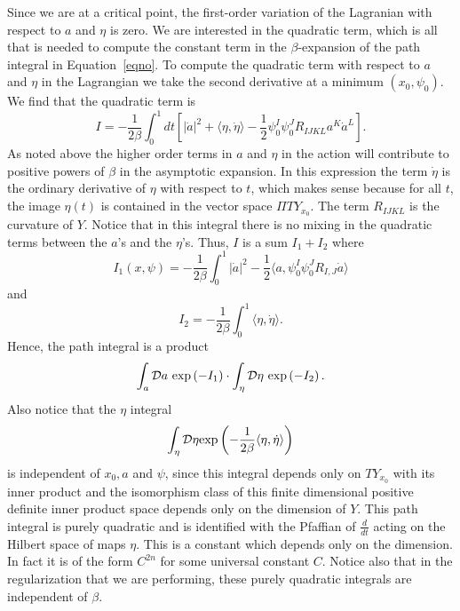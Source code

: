 Since we are at a critical point, the first-order variation of the
Lagranian with respect to $a$ and $\eta$ is zero.
We are interested in the quadratic term, which is all that is needed
to compute the constant term in the $\beta$-expansion of
the path integral in Equation~\ref{eqno}.
To compute the quadratic term with respect to $a$ and $\eta$ 
in the Lagrangian we take the second 
derivative at a minimum $(x_0,\psi_0)$.
We find that the quadratic term
is
$$I=-\frac{1}{2\beta}\int_0^1dt\left[|\dot a|^2+\langle
\eta,\dot\eta\rangle-\frac{1}{2}\psi_0^I\psi_0^JR_{IJKL}a^K\dot
a^L\right].$$
As noted above the higher order terms in $a$ and $\eta$ in the action
will contribute to positive powers of 
$\beta$ in the asymptotic expansion.
In this expression the term $\dot \eta$ is the ordinary derivative of
$\eta$ with respect to $t$, which makes sense because for all $t$, the
image $\eta(t)$ is
contained in the vector space $\Pi TY_{x_0}$.
The term $R_{IJKL}$ is the curvature of $Y$.
Notice that in this integral there is no mixing in the quadratic terms
between the $a$'s and the $\eta$'s. 
Thus, $I$ is a sum  $I_1+I_2$
where
$$I_1(x,\psi)=-\frac{1}{2\beta}\int_0^1|\dot a|^2-\frac{1}{2} \langle
a,\psi_0^I\psi_0^J R_{I,J}\dot a\rangle $$
and
$$I_2=-\frac{1}{2\beta}\int_0^1\langle \eta,\dot \eta\rangle.$$
Hence,  the path integral
is a product 
$$\int_a{\cal D}a\ {\rm exp}\left(-I_1\right)\cdot
\int_\eta{\cal D}\eta\  
{\rm exp}\left(-I_2 \right).$$
Also notice that the $\eta$ integral
$$\int_\eta{\cal D}\eta{\rm exp}\left(-\frac{1}{2\beta}\langle
\eta,\dot\eta\rangle\right) $$
 is independent of $x_0,a$ and
$\psi$, since this integral depends only on $TY_{x_0}$ with its inner
product and the isomorphism class of this finite dimensional positive
definite inner product space depends only on the dimension of $Y$.
This path integral is purely quadratic and is identified
with the Pfaffian of $\frac{d}{dt}$ acting on the Hilbert space
of maps $\eta$. 
This is a constant which depends only on the dimension.
In fact it is of the form $C^{2n}$ for some universal constant $C$.
Notice also that in the regularization that we are performing, these
purely quadratic integrals are independent of $\beta$.

